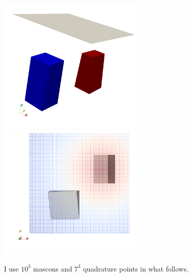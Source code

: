 \begin{center}
\includegraphics[width=7cm]{python_codes/fieldstone_113/images/blocks_1}
\includegraphics[width=7cm]{python_codes/fieldstone_113/images/blocks_2}
\end{center}

I use $10^3$ mascons and $7^3$ quadrature points in what follows.

